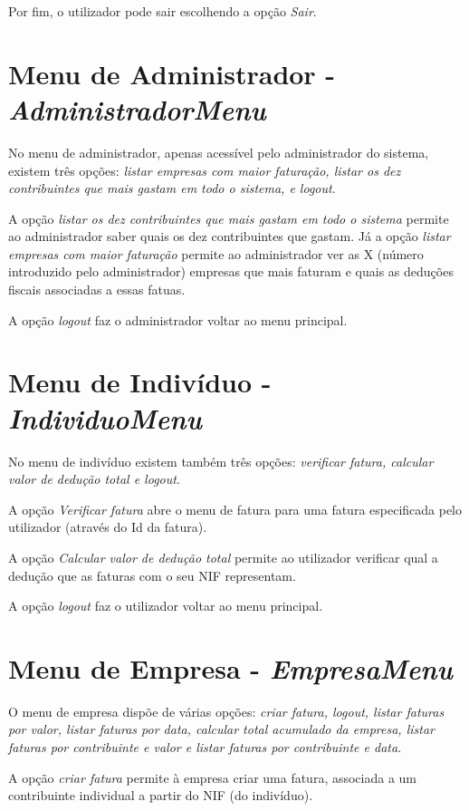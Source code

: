 \documentclass[12pt]{report}
\newcommand\tab[1][0.5cm]{\hspace*{#1}}
\begin{document}
Por fim, o utilizador pode sair escolhendo a opção \textit{Sair}.

\section{Menu de Administrador - \textit{AdministradorMenu}}
\tab No menu de administrador, apenas acessível pelo administrador do sistema, existem três opções: \textit{listar empresas com maior faturação, listar os dez contribuintes que mais gastam em todo o sistema, e logout}.

A opção \textit{listar os dez contribuintes que mais gastam em todo o sistema} permite ao administrador saber quais os dez contribuintes que gastam. Já a opção \textit{listar empresas com maior faturação} permite ao administrador ver as X (número introduzido pelo administrador) empresas que mais faturam e quais as deduções fiscais associadas a essas fatuas.

A opção \textit{logout} faz o administrador voltar ao menu principal.

\section{Menu de Indivíduo - \textit{IndividuoMenu}}
\tab No menu de indivíduo existem também três opções: \textit{verificar fatura, calcular valor de dedução total e logout}.

A opção \textit{Verificar fatura} abre o menu de fatura para uma fatura especificada pelo utilizador (através do Id da fatura).

A opção \textit{Calcular valor de dedução total} permite ao utilizador verificar qual a dedução que as faturas com o seu NIF representam.

A opção \textit{logout} faz o utilizador voltar ao menu principal.

\section{Menu de Empresa - \textit{EmpresaMenu}}
\tab O menu de empresa dispõe de várias opções: \textit{criar fatura, logout, listar faturas por valor, listar faturas por data, calcular total acumulado da empresa, listar faturas por contribuinte e valor e listar faturas por contribuinte e data}.

A opção \textit{criar fatura} permite à empresa criar uma fatura, associada a um contribuinte individual a partir do NIF (do indivíduo).
\end{document}
